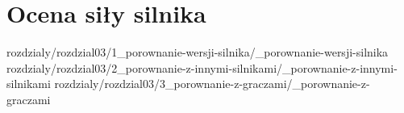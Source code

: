 
\chapter {Ocena siły silnika}
\label {ch: ocena-sily-silnika}

 {rozdzialy/rozdzial03/1_porownanie-wersji-silnika/_porownanie-wersji-silnika}
 {rozdzialy/rozdzial03/2_porownanie-z-innymi-silnikami/_porownanie-z-innymi-silnikami}
 {rozdzialy/rozdzial03/3_porownanie-z-graczami/_porownanie-z-graczami}


